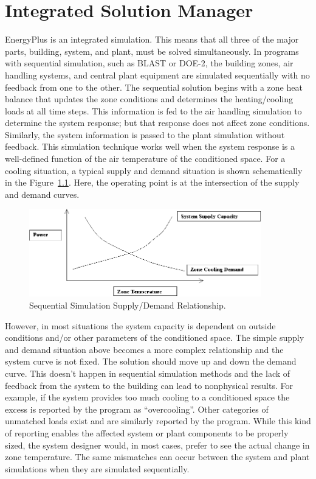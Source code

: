 \chapter{Integrated Solution Manager}\label{integrated-solution-manager}

EnergyPlus is an integrated simulation. This means that all three of the major parts, building, system, and plant, must be solved simultaneously. In programs with sequential simulation, such as BLAST or DOE-2, the building zones, air handling systems, and central plant equipment are simulated sequentially with no feedback from one to the other. The sequential solution begins with a zone heat balance that updates the zone conditions and determines the heating/cooling loads at all time steps. This information is fed to the air handling simulation to determine the system response; but that response does not affect zone conditions. Similarly, the system information is passed to the plant simulation without feedback. This simulation technique works well when the system response is a well-defined function of the air temperature of the conditioned space. For a cooling situation, a typical supply and demand situation is shown schematically in the Figure~\ref{fig:sequential-simulation-supplydemand}. Here, the operating point is at the intersection of the supply and demand curves.

\begin{figure}[hbtp] %
\centering
\includegraphics[width=0.9\textwidth, height=0.9\textheight, keepaspectratio=true]{media/image7.png}
\caption{Sequential Simulation Supply/Demand Relationship. \protect \label{fig:sequential-simulation-supplydemand}}
\end{figure}

However, in most situations the system capacity is dependent on outside conditions and/or other parameters of the conditioned space. The simple supply and demand situation above becomes a more complex relationship and the system curve is not fixed. The solution should move up and down the demand curve. This doesn't happen in sequential simulation methods and the lack of feedback from the system to the building can lead to nonphysical results. For example, if the system provides too much cooling to a conditioned space the excess is reported by the program as ``overcooling''. Other categories of unmatched loads exist and are similarly reported by the program. While this kind of reporting enables the affected system or plant components to be properly sized, the system designer would, in most cases, prefer to see the actual change in zone temperature. The same mismatches can occur between the system and plant simulations when they are simulated sequentially.

